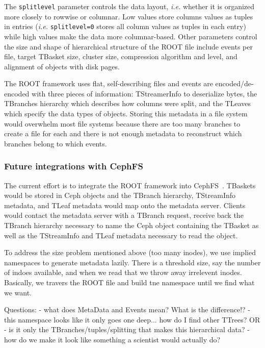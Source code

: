 The \texttt{splitlevel} parameter controls the data layout, {\it i.e.}
whether it is organized more closely to rowwise or columnar. Low values
store columns values as tuples in entries ({\it i.e.} \texttt{splitlevel=0}
stores all column values as tuples in each entry) while high values make
the data more columnar-based. Other parameters control the size and shape
of hierarchical structure of the ROOT file include events per file, target
TBasket size, cluster size, compression algorithm and level, and alignment
of objects with disk pages.

The ROOT framework uses flat, self-describing files and events are
encoded/de-encoded with three pieces of information: TStreamerInfo to
deserialize bytes, the TBranches hierarchy which describes how columns were
split, and the TLeaves which specify the data types of objects. Storing this
metadata in a file system would overwhelm most file systems because there are
too many branches to create a file for each and there is not enough metadata to
reconstruct which branches belong to which events.

\subsubsection{Future integrations with CephFS}

The current effort is to integrate the ROOT framework into CephFS~\cite{weil:osdi2006-ceph}. TBaskets
would be stored in Ceph objects and the TBranch hierarchy, TStreamInfo
metadata, and TLeaf metadata would map onto the metadata server. Clients would
contact the metadata server with a TBranch request, receive back the TBranch
hierarchy necessary to name the Ceph object containing the TBasket as well as
the TStreamInfo and TLeaf metadata necessary to read the object. 

To address the size problem mentioned above (too many inodes), we use implied
namespaces to generate metadata lazily. There is a threshold size, say the
number of indoes available, and when we read that we throw away irrelevent
inodes. Basically, we travers the ROOT file and build tne namespace until we
find what we want.

Questions: 
- what does MetaData and Events mean? What is the difference!?
- this namespace looks like it only goes one deep... how do I find other TTrees? OR
- is it only the TBranches/tuples/splitting that makes this hierarchical data? 
  - how do we make it look like something a scientist would actually do?

